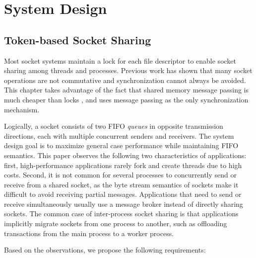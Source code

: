 
\section{System Design}
\label{socksdirect:sec:design}


\subsection{Token-based Socket Sharing}
\label{socksdirect:subsec:fork}


Most socket systems maintain a lock for each file descriptor to enable socket sharing among threads and processes.
Previous work \cite {boyd2010analysis,clements2015scalable} has shown that many socket operations are not commutative and synchronization cannot always be avoided.
This chapter takes advantage of the fact that shared memory message passing is much cheaper than locks \cite {roghanchi2017ffwd}, and uses message passing as the only synchronization mechanism.


Logically, a socket consists of two FIFO \emph {queues} in opposite transmission directions, each with multiple concurrent senders and receivers.
The system design goal is to maximize general case performance while maintaining FIFO semantics.
This paper observes the following two characteristics of applications: first, high-performance applications rarely fork and create threads due to high costs.
Second, it is not common for several processes to concurrently send or receive from a shared socket, as the byte stream semantics of sockets make it difficult to avoid receiving partial messages.
Applications that need to send or receive simultaneously usually use a message broker \cite {hintjens2013zeromq,rabbitmq2017rabbitmq,kreps2011kafka} instead of directly sharing sockets.
The common case of inter-process socket sharing is that applications implicitly migrate sockets from one process to another, such as offloading transactions from the main process to a worker process.




\iffalse
Based on the observations, we propose the following requirements:

